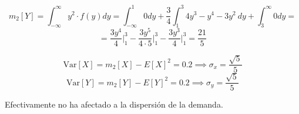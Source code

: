 $$m_2[Y] = \int_{-\infty}^{\infty} y^2\cdot f(y)dy = \int_{-\infty}^1 0dy + \dfrac{3}{4} \int_1^3 4y^3 - y^4 -3y^2\ dy + \int_3^{\infty} 0dy = $$ 
$$= \dfrac{3y^4}{4} \biggr\rvert_1^3 - \dfrac{3y^5}{4\cdot5}\biggr\rvert_1^3 - \dfrac{3y^3}{4}\biggr\rvert_1^3= \dfrac{21}{5}$$

$$\mbox{Var}[X] = m_2[X] - E[X]^2 = 0.2 \implies \sigma_x = \dfrac{\sqrt{5}}{5}$$
$$\mbox{Var}[Y] = m_2[Y] - E[Y]^2 = 0.2 \implies \sigma_y = \dfrac{\sqrt{5}}{5}$$

Efectivamente no ha afectado a la dispersión de la demanda.
